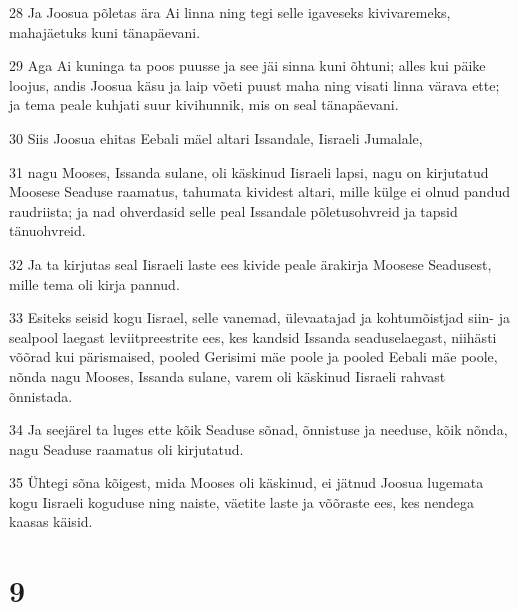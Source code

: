 \par 28 Ja Joosua põletas ära Ai linna ning tegi selle igaveseks kivivaremeks, mahajäetuks kuni tänapäevani.
\par 29 Aga Ai kuninga ta poos puusse ja see jäi sinna kuni õhtuni; alles kui päike loojus, andis Joosua käsu ja laip võeti puust maha ning visati linna värava ette; ja tema peale kuhjati suur kivihunnik, mis on seal tänapäevani.
\par 30 Siis Joosua ehitas Eebali mäel altari Issandale, Iisraeli Jumalale,
\par 31 nagu Mooses, Issanda sulane, oli käskinud Iisraeli lapsi, nagu on kirjutatud Moosese Seaduse raamatus, tahumata kividest altari, mille külge ei olnud pandud raudriista; ja nad ohverdasid selle peal Issandale põletusohvreid ja tapsid tänuohvreid.
\par 32 Ja ta kirjutas seal Iisraeli laste ees kivide peale ärakirja Moosese Seadusest, mille tema oli kirja pannud.
\par 33 Esiteks seisid kogu Iisrael, selle vanemad, ülevaatajad ja kohtumõistjad siin- ja sealpool laegast leviitpreestrite ees, kes kandsid Issanda seaduselaegast, niihästi võõrad kui pärismaised, pooled Gerisimi mäe poole ja pooled Eebali mäe poole, nõnda nagu Mooses, Issanda sulane, varem oli käskinud Iisraeli rahvast õnnistada.
\par 34 Ja seejärel ta luges ette kõik Seaduse sõnad, õnnistuse ja needuse, kõik nõnda, nagu Seaduse raamatus oli kirjutatud.
\par 35 Ühtegi sõna kõigest, mida Mooses oli käskinud, ei jätnud Joosua lugemata kogu Iisraeli koguduse ning naiste, väetite laste ja võõraste ees, kes nendega kaasas käisid.

\chapter{9}

